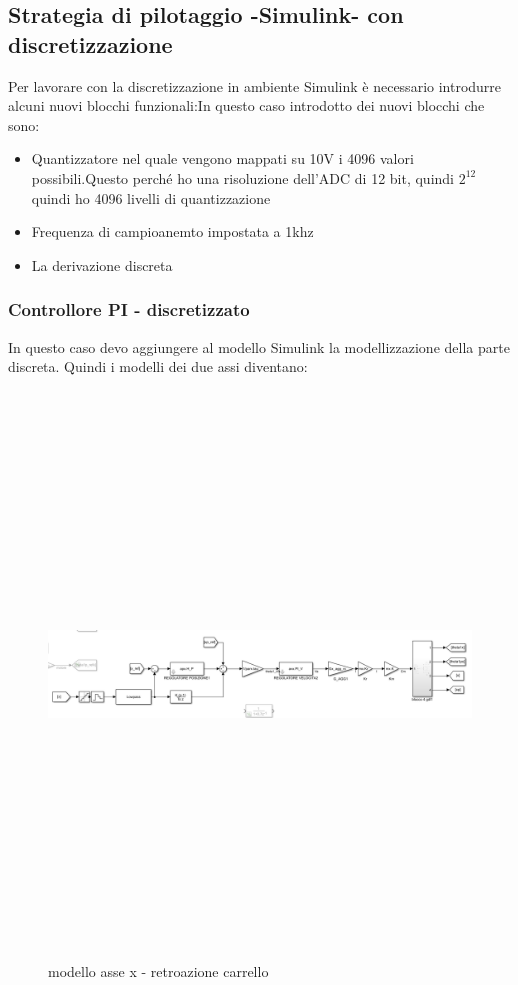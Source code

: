 \documentclass{article}
\begin{document}
\subsection{Strategia di pilotaggio -Simulink- con discretizzazione}
Per lavorare con la discretizzazione in ambiente Simulink è necessario introdurre alcuni nuovi blocchi funzionali:In questo caso introdotto dei nuovi blocchi che sono:
\begin{itemize}
    \item  Quantizzatore nel quale vengono mappati su 10V i 4096 valori possibili.Questo perché ho una risoluzione dell'ADC di 12 bit, quindi $2^{12}$ quindi ho 4096 livelli di quantizzazione
    \item  Frequenza di campioanemto impostata a 1khz 
    \item  La derivazione discreta 
\end{itemize}

\subsubsection{Controllore PI - discretizzato}
In questo caso devo aggiungere al modello Simulink la modellizzazione della parte discreta. Quindi i modelli dei due assi diventano:

\begin{figure}[H]
\centering
\includegraphics[width=12cm,height=15cm,keepaspectratio]{./strategia_sim/PIcarrx.png} 
\caption{modello asse x - retroazione carrello}
\end{figure}
\end{document}
